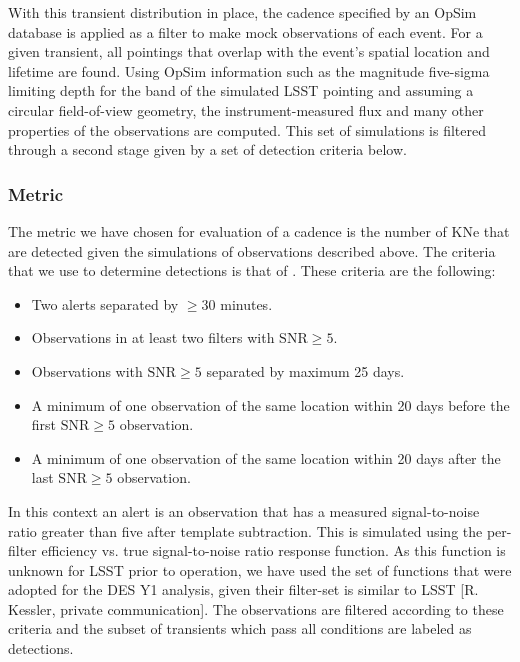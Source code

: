 With this transient distribution in place, the cadence specified by an OpSim database is applied as a filter to make mock observations of each event. For a given transient, all pointings that overlap with the event's spatial location and lifetime are found. Using OpSim information such as the magnitude five-sigma limiting depth for the band of the simulated LSST pointing and assuming a circular field-of-view geometry, the instrument-measured flux and many other properties of the observations are computed. This set of simulations is filtered through a second stage given by a set of detection criteria below.

\subsubsection{Metric}
The metric we have chosen for evaluation of a cadence is the number of KNe that are detected given the simulations of observations described above. The criteria that we use to determine detections is that of \citet{Scolnic2017a}. These criteria are the following:
\begin{itemize}
  \item Two alerts separated by $\geq 30$ minutes.
  \item Observations in at least two filters with $\mathrm{SNR} \geq 5$.
  \item Observations with $\mathrm{SNR} \geq 5$ separated by maximum 25 days.
  \item A minimum of one observation of the same location within 20 days before the first $\mathrm{SNR} \geq 5$ observation.
  \item A minimum of one observation of the same location within 20 days after the last $\mathrm{SNR} \geq 5$ observation.
\end{itemize}

In this context an alert is an observation that has a measured signal-to-noise ratio greater than five after template subtraction. This is simulated using the per-filter efficiency vs. true signal-to-noise ratio response function. As this function is unknown for LSST prior to operation, we have used the set of functions that were adopted for the DES Y1 analysis, given their filter-set is similar to LSST [R. Kessler, private communication]. The observations are filtered according to these criteria and the subset of transients which pass all conditions are labeled as detections.

